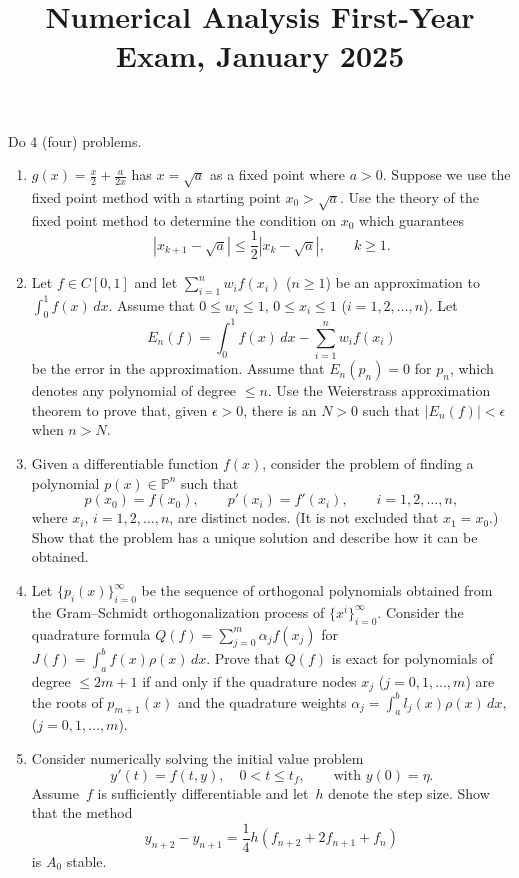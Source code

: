 \documentclass[11pt,letterpaper]{article}
\title{Numerical Analysis First-Year Exam, January 2025}
\author{}
\date{}
\newenvironment{examproblems}[2]{%
  \def\ProblemHeadingTag{#2}%
  \AssignTaggingSocketPlug{block/list/label}{examproblem}%
  \begin{enumerate}%
  \setcounter{enumi}{#1}%
  \renewcommand{\labelenumi}{\textbf{\theenumi.}}%
  \setlength{\topsep}{0.35em}%
  \setlength{\partopsep}{0pt}%
  \setlength{\itemsep}{0.48em}%
  \setlength{\parsep}{0.18em}%
}{\end{enumerate}}
\newenvironment{examinstructions}{%
  \par\begingroup\itshape
}{%
  \par\endgroup\vspace{0.18em}
}
\begin{document}
\maketitle
\thispagestyle{empty}
\begin{examinstructions}
Do 4 (four) problems.
\end{examinstructions}
\begin{examproblems}{0}{H2}
\def\ProblemHeadingText{Problem 1.}
\item
\(g(x)=\frac{x}{2}+\frac{a}{2x}\) has \(x=\sqrt{a}\) as a fixed point where \(a>0\). Suppose we use the fixed point method with a starting point \(x_0>\sqrt{a}\). Use the theory of the fixed point method to determine the condition on \(x_0\) which guarantees
\[
|x_{k+1}-\sqrt{a}|\leq \frac{1}{2}|x_k-\sqrt{a}|,\qquad k\geq 1.
\]
\def\ProblemHeadingText{Problem 2.}
\item
Let \(f\in C[0,1]\) and let \(\sum_{i=1}^n w_i f(x_i)\) (\(n\geq 1\)) be an approximation to \(\int_0^1 f(x)\,dx\). Assume that \(0\leq w_i\leq 1\), \(0\leq x_i\leq 1\) (\(i=1,2,\ldots,n\)). Let
\[
E_n(f)=\int_0^1 f(x)\,dx-\sum_{i=1}^n w_i f(x_i)
\]
 be the error in the approximation. Assume that \(E_n(p_n)=0\) for \(p_n\), which denotes any polynomial of degree \(\leq n\). Use the Weierstrass approximation theorem to prove that, given \(\epsilon>0\), there is an \(N>0\) such that \(|E_n(f)|<\epsilon\) when \(n>N\).
\def\ProblemHeadingText{Problem 3.}
\item
Given a differentiable function \(f(x)\), consider the problem of finding a polynomial \(p(x)\in\mathbb{P}^n\) such that
\[
p(x_0)=f(x_0),\qquad p'(x_i)=f'(x_i),\qquad i=1,2,\ldots,n,
\]
 where \(x_i\), \(i=1,2,\ldots,n\), are distinct nodes. (It is not excluded that \(x_1=x_0\).) Show that the problem has a unique solution and describe how it can be obtained.
\def\ProblemHeadingText{Problem 4.}
\item
Let \(\{p_i(x)\}_{i=0}^{\infty}\) be the sequence of orthogonal polynomials obtained from the Gram–Schmidt orthogonalization process of \(\{x^i\}_{i=0}^{\infty}\). Consider the quadrature formula \(Q(f)=\sum_{j=0}^m \alpha_j f(x_j)\) for \(J(f)=\int_a^b f(x)\rho(x)\,dx\). Prove that \(Q(f)\) is exact for polynomials of degree \(\leq 2m+1\) if and only if the quadrature nodes \(x_j\) (\(j=0,1,\ldots,m\)) are the roots of \(p_{m+1}(x)\) and the quadrature weights \(\alpha_j=\int_a^b l_j(x)\rho(x)\,dx\), (\(j=0,1,\ldots,m\)).
\def\ProblemHeadingText{Problem 5.}
\item
Consider numerically solving the initial value problem
\[
y'(t)=f(t,y),\quad 0<t\leq t_f,\qquad \text{with }y(0)=\eta.
\]
 Assume~\(f\) is sufficiently differentiable and let~\(h\) denote the step size. Show that the method
\[
y_{n+2}-y_{n+1}=\frac{1}{4}h(f_{n+2}+2f_{n+1}+f_n)
\]
 is \(A_0\) stable.
\end{examproblems}
\end{document}

